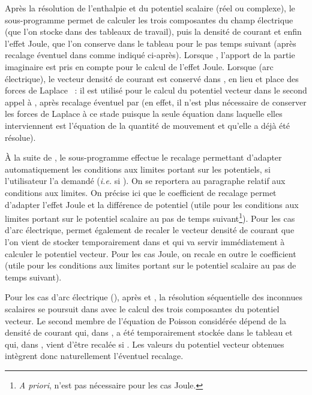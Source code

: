 Apr\`es la r\'esolution de l'enthalpie et du potentiel scalaire
(r\'eel ou complexe), le sous-programme  permet de calculer 
les trois composantes du champ \'electrique 
(que l'on stocke dans des tableaux de travail), puis la densit\'e de courant
et enfin l'effet Joule, que l'on conserve dans le tableau  
pour le pas temps suivant (apr\`es recalage \'eventuel dans  comme
indiqu\'e ci-apr\`es). 
Lorsque ,  l'apport de la partie imaginaire est pris en
compte pour le calcul de l'effet Joule. Lorsque 
(arc \'electrique), le vecteur densit\'e de courant est 
conserv\'e dans , en lieu et place des forces de Laplace
~: il est utilis\'e pour le calcul du potentiel vecteur dans le
second appel \`a , 
apr\`es recalage \'eventuel par  (en effet, il n'est plus
n\'ecessaire de conserver les forces de Laplace \`a ce stade puisque 
la seule \'equation dans laquelle elles interviennent est l'\'equation de la
quantit\'e de mouvement et qu'elle a d\'ej\`a \'et\'e r\'esolue).  

\`A la suite de , 
le sous-programme  effectue le recalage permettant d'adapter automatiquement
les conditions aux limites portant sur les potentiels, si l'utilisateur l'a
demand\'e ({\it i.e.} si ).  
On se reportera au paragraphe relatif aux conditions aux limites. On pr\'ecise
ici que le coefficient de recalage  permet d'adapter l'effet Joule
 et la diff\'erence de potentiel  
(utile pour les conditions aux limites portant sur le potentiel scalaire au pas
de temps suivant\footnote{{\it A priori},  n'est pas n\'ecessaire pour les
cas Joule.}).  
Pour les cas d'arc \'electrique,  permet \'egalement de
recaler le vecteur densit\'e de courant que l'on vient
de stocker temporairement dans  et qui va
servir imm\'ediatement \`a calculer le potentiel vecteur. 
Pour les cas Joule,  on recale en outre le coefficient  (utile
pour les conditions aux limites portant sur le potentiel scalaire au pas de
temps suivant).  
 
Pour les cas d'arc \'electrique (), 
apr\`es  et , 
la r\'esolution s\'equentielle des inconnues scalaires se poursuit dans
 avec le calcul des trois composantes du potentiel vecteur. Le second membre de
l'\'equation de Poisson consid\'er\'ee d\'epend de la densit\'e de courant qui,
dans , a \'et\'e temporairement stock\'ee dans le tableau
 et qui,  dans , vient d'\^etre
recal\'ee si . 
Les valeurs du potentiel vecteur obtenues int\`egrent donc  naturellement l'\'eventuel
recalage.  

